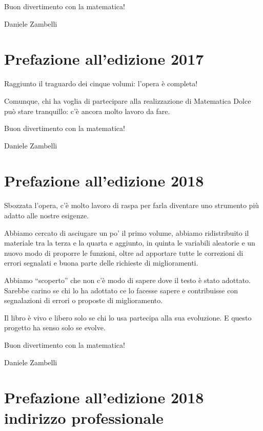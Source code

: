 Buon divertimento con la matematica!

\begin{flushright}
Daniele Zambelli
\end{flushright}

\section{Prefazione all'edizione 2017}

Raggiunto il traguardo dei cinque volumi: l'opera è completa!

Comunque, chi ha voglia di partecipare alla realizzazione di Matematica Dolce
può stare tranquillo:
c'è ancora molto lavoro da fare.

Buon divertimento con la matematica!

\begin{flushright}
Daniele Zambelli
\end{flushright}

\section{Prefazione all'edizione 2018}

Sbozzata l'opera, c'è molto lavoro di raspa per farla diventare uno
strumento più adatto alle nostre esigenze.

Abbiamo cercato di asciugare un po' il primo volume, abbiamo ridistribuito
il materiale tra la terza e la quarta e aggiunto, in quinta le variabili
aleatorie e un nuovo modo di proporre le funzioni,
oltre ad apportare tutte le correzioni di errori segnalati e buona parte
delle richieste di miglioramenti.

Abbiamo ``scoperto'' che non c'è modo di sapere dove il testo è stato
adottato. Sarebbe carino se chi lo ha adottato ce lo facesse sapere e
contribuisse con segnalazioni di errori o proposte di miglioramento.

Il libro è vivo e libero solo se chi lo usa partecipa alla sua evoluzione.
E questo progetto ha senso solo se evolve.

Buon divertimento con la matematica!

\begin{flushright}
Daniele Zambelli
\end{flushright}

\section{Prefazione all'edizione 2018 indirizzo professionale}

